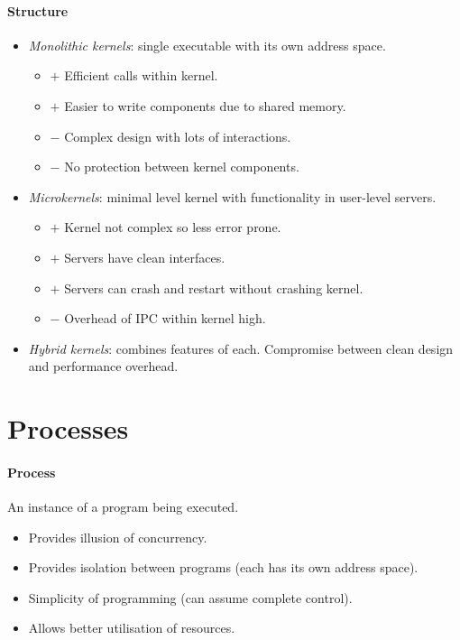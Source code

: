 \documentclass[twocolumn,english]{article}
\begin{document}
\paragraph{Structure}
\begin{itemize}
\item \emph{Monolithic kernels}: single executable with its own address
space.
\begin{itemize}
\item $+$ Efficient calls within kernel.
\item $+$ Easier to write components due to shared memory.
\item $-$ Complex design with lots of interactions.
\item $-$ No protection between kernel components.
\end{itemize}
\item \emph{Microkernels}: minimal level kernel with functionality in user-level
servers.
\begin{itemize}
\item $+$ Kernel not complex so less error prone.
\item $+$ Servers have clean interfaces.
\item $+$ Servers can crash and restart without crashing kernel.
\item $-$ Overhead of IPC within kernel high.
\end{itemize}
\item \emph{Hybrid kernels}: combines features of each. Compromise between
clean design and performance overhead.
\end{itemize}

\section{Processes}

\paragraph{Process}

An instance of a program being executed.
\begin{itemize}
\item Provides illusion of concurrency.
\item Provides isolation between programs (each has its own address space).
\item Simplicity of programming (can assume complete control).
\item Allows better utilisation of resources.
\end{itemize}
\end{document}
